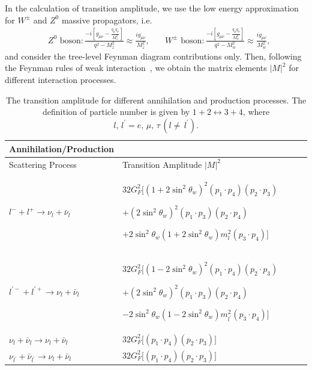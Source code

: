 In the calculation of transition amplitude, we use the low energy approximation for $W^\pm$ and $Z^0$ massive propagators, i.e.
\begin{align}
&\mbox{$Z^0$ boson}:\frac{-i\left[g_{\mu\nu}-\frac{q_\mu q_\nu}{M^2_z}\right]}{q^2-M^2_z}\approx\frac{ig_{\mu\nu}}{M^2_z},\quad
&\mbox{$W^\pm$ boson}:\frac{-i\left[g_{\mu\nu}-\frac{q_\mu q_\nu}{M^2_w}\right]}{q^2-M^2_w}\approx\frac{ig_{\mu\nu}}{M^2_w},
\end{align}
and consider the tree-level Feynman diagram contributions only. Then, following the Feynman rules of weak interaction~\cite{Griffiths:2008zz}, we obtain the matrix elements $|M|^2$ for different interaction processes.
\begin{table}[ht]
\centering
\begin{tabular}{lp{8cm}lp{8cm}l}
\hline\hline
Annihilation/Production \\
\hline\hline
Scattering Process & Transition Amplitude $|M|^2$ \\
\hline
$l^-+l^+\longrightarrow\nu_l+\bar{\nu}_l$ &$ 32G^2_F\bigg[\left(1+2\sin^2\theta_w\right)^2\left(p_1\cdot p_4\right)\left(p_2\cdot p_3\right)$

$+\left(2\sin^2\theta_w\right)^2\left(p_1\cdot p_3\right)\left(p_2\cdot p_4\right)$

$+2\sin^2\theta_w\left(1+2\sin^2\theta_w\right)m^2_l\left(p_3\cdot p_4\right)\bigg]$ \\
\hline
$l^{\prime-}+l^{\prime+}\longrightarrow\nu_l+\bar{\nu}_l$ & $32G^2_F\bigg[\left(1-2\sin^2\theta_w\right)^2\left(p_1\cdot p_4\right)\left(p_2\cdot p_3\right)$

$+\left(2\sin^2\theta_w\right)^2\left(p_1\cdot p_3\right)\left(p_2\cdot p_4\right)$

$-2\sin^2\theta_w\left(1-2\sin^2\theta_w\right)m^2_{l^\prime}\left(p_3\cdot p_4\right)\bigg]$ \\
\hline
$\nu_l+\bar{\nu}_l\longrightarrow\nu_l+\bar{\nu}_l$ &
$32G^2_F\bigg[\left(p_1\cdot p_4\right)\left(p_2\cdot p_3\right)\bigg]$ \\
\hline
$\nu_{l^\prime}+\bar{\nu}_{l^\prime}\longrightarrow\nu_l+\bar{\nu}_l$ &
$32G^2_F\bigg[\left(p_1\cdot p_4\right)\left(p_2\cdot p_3\right)\bigg]$ \\
\hline\hline
\end{tabular}
\caption{The transition amplitude for different annihilation and production processes. The definition of particle number is given by $1+2\leftrightarrow3+4$, where $l,\,l^\prime=e,\,\mu,\,\tau\,(l\neq\,l^\prime)$.}
\label{T005}
\end{table}
